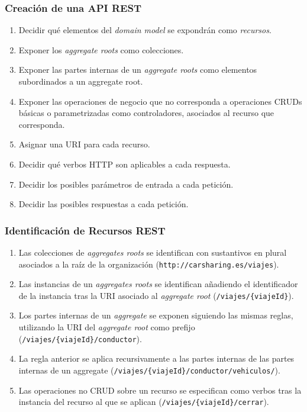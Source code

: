 \documentclass[handout,a4paper,slidestop,xcolor=pst,blue]{beamer}
\begin{document}
\begin{frame}[c]
    \frametitle{Creación de una API REST}
    \begin{enumerate}[<+->]
        \item Decidir qué elementos del \emph{domain model} se expondrán como \emph{recursos}.
        \item Exponer los \emph{aggregate roots} como colecciones.
        \item Exponer las partes internas de un \emph{aggregate roots} como elementos subordinados a un aggregate root.
        \item Exponer las operaciones de negocio que no corresponda a operaciones CRUDs básicas o parametrizadas como controladores, asociados al recurso que corresponda.
        \item Asignar una URI para cada recurso.
        \item Decidir qué verbos HTTP son aplicables a cada respuesta.
        \item Decidir los posibles parámetros de entrada a cada petición.
        \item Decidir las posibles respuestas a cada petición.
    \end{enumerate}
\end{frame}

\begin{frame}[c]
    \frametitle{Identificación de Recursos REST}
    \begin{enumerate}[<+->]
        \item Las colecciones de \emph{aggregates roots} se identifican con sustantivos en plural asociados a la raíz de la organización (\texttt{http://carsharing.es/viajes}).
        \item Las instancias de un \emph{aggregates roots} se identifican añadiendo el identificador de la instancia tras la URI asociado al \emph{aggregate root}
            (\texttt{/viajes/\{viajeId\}}).
        \item Los partes internas de un \emph{aggregate} se exponen siguiendo las mismas reglas, utilizando la URI del \emph{aggregate root} como prefijo (\texttt{/viajes/\{viajeId\}/conductor}).
        \item La regla anterior se aplica recursivamente a las partes internas de las partes internas de un aggregate (\texttt{/viajes/\{viajeId\}/conductor/vehiculos/}).
        \item Las operaciones no CRUD sobre un recurso se especifican como verbos tras la instancia del recurso al que se aplican (\texttt{/viajes/\{viajeId\}/cerrar}).
    \end{enumerate}
\end{frame}
\end{document}

